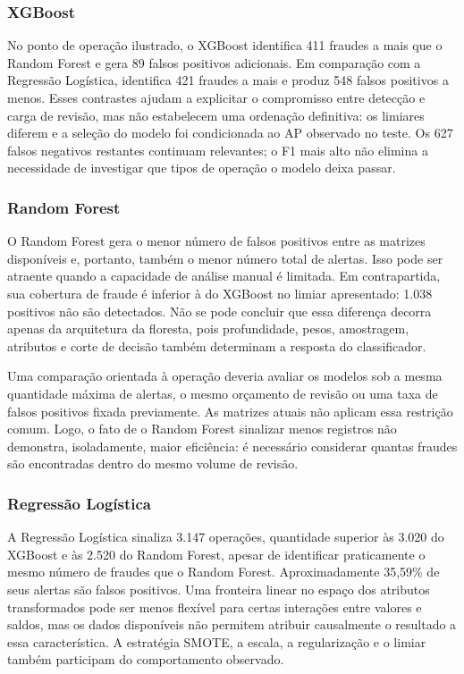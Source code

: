 \documentclass[11pt,a4paper]{article}
\begin{document}
\subsubsection{XGBoost}

No ponto de operação ilustrado, o XGBoost identifica 411 fraudes a mais que o Random Forest e gera 89 falsos positivos adicionais. Em comparação com a Regressão Logística, identifica 421 fraudes a mais e produz 548 falsos positivos a menos. Esses contrastes ajudam a explicitar o compromisso entre detecção e carga de revisão, mas não estabelecem uma ordenação definitiva: os limiares diferem e a seleção do modelo foi condicionada ao AP observado no teste. Os 627 falsos negativos restantes continuam relevantes; o F1 mais alto não elimina a necessidade de investigar que tipos de operação o modelo deixa passar.

\subsubsection{Random Forest}

O Random Forest gera o menor número de falsos positivos entre as matrizes disponíveis e, portanto, também o menor número total de alertas. Isso pode ser atraente quando a capacidade de análise manual é limitada. Em contrapartida, sua cobertura de fraude é inferior à do XGBoost no limiar apresentado: 1.038 positivos não são detectados. Não se pode concluir que essa diferença decorra apenas da arquitetura da floresta, pois profundidade, pesos, amostragem, atributos e corte de decisão também determinam a resposta do classificador.

Uma comparação orientada à operação deveria avaliar os modelos sob a mesma quantidade máxima de alertas, o mesmo orçamento de revisão ou uma taxa de falsos positivos fixada previamente. As matrizes atuais não aplicam essa restrição comum. Logo, o fato de o Random Forest sinalizar menos registros não demonstra, isoladamente, maior eficiência: é necessário considerar quantas fraudes são encontradas dentro do mesmo volume de revisão.

\subsubsection{Regressão Logística}

A Regressão Logística sinaliza 3.147 operações, quantidade superior às 3.020 do XGBoost e às 2.520 do Random Forest, apesar de identificar praticamente o mesmo número de fraudes que o Random Forest. Aproximadamente 35,59\% de seus alertas são falsos positivos. Uma fronteira linear no espaço dos atributos transformados pode ser menos flexível para certas interações entre valores e saldos, mas os dados disponíveis não permitem atribuir causalmente o resultado a essa característica. A estratégia SMOTE, a escala, a regularização e o limiar também participam do comportamento observado.
\end{document}
